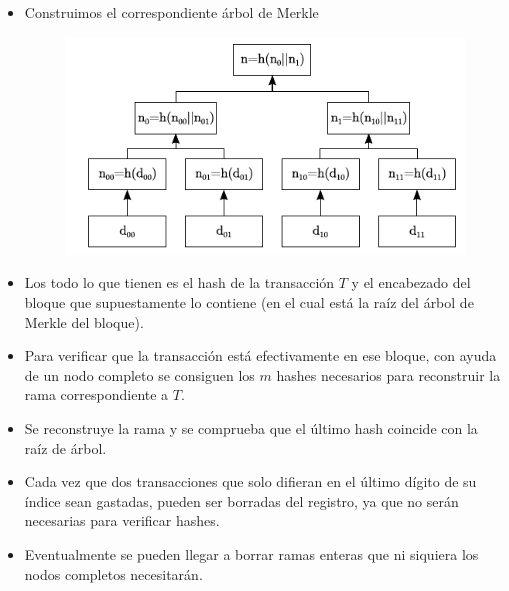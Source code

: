 \documentclass{beamer}
\theoremstyle{definition}
\begin{document}
\begin{frame}
	\begin{itemize}
		\item<1-> Construimos el correspondiente árbol de Merkle
		\begin{figure}
			\includegraphics[scale=0.6]{merkle}
		\end{figure}
	\end{itemize}
\end{frame}

\begin{frame}
	\begin{itemize}
		\item<1-> Los  todo lo que tienen es el hash de la transacción $T$ y el encabezado del bloque que supuestamente lo contiene (en el cual está la raíz del árbol de Merkle del bloque).
		\item<2-> Para verificar que la transacción está efectivamente en ese bloque, con ayuda de un nodo completo se consiguen los $m$ hashes necesarios para reconstruir la rama correspondiente a $T$.
		\item<3-> Se reconstruye la rama y se comprueba que el último hash coincide con la raíz de árbol.
	\end{itemize}
\end{frame}

\begin{frame}
	\begin{itemize}
		\item Cada vez que dos transacciones que solo difieran en el último dígito de su índice sean gastadas, pueden ser borradas del registro, ya que no serán necesarias para verificar hashes.
		\item Eventualmente se pueden llegar a borrar ramas enteras que ni siquiera los nodos completos necesitarán.
	\end{itemize}
\end{frame}
\end{document}
